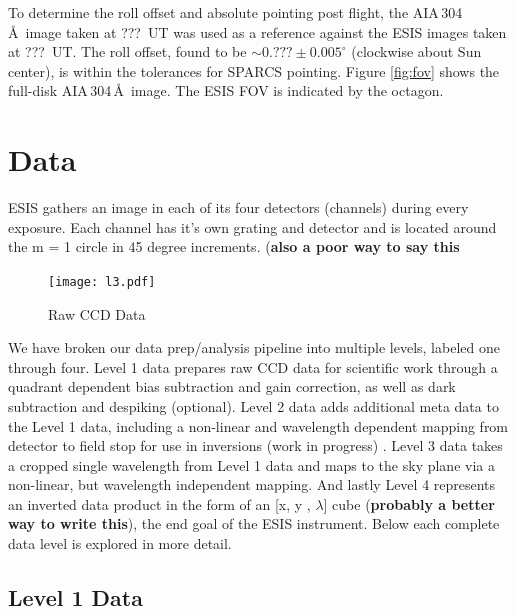 		To determine the roll offset and absolute pointing post flight, the AIA\,304\,\AA\ image taken at ???~UT was used as a reference against the ESIS images taken at ???~UT.  The roll offset, found to be $\sim0.???\pm 0.005^\circ$ (clockwise about Sun center), is within the tolerances for SPARCS pointing.  Figure \ref{fig:fov} shows the full-disk AIA\,304\,\AA\ image. The ESIS FOV is indicated by the octagon.  
	
\section{Data} 

    ESIS gathers an image in each of its four detectors (channels) during every exposure.  
    Each channel has it's own grating and detector and is located around the m = 1 circle in 45 degree increments. (\textbf{also a poor way to say this}
    
    \begin{figure}[ht]
        \centering
       	\texttt{[image: l3.pdf]}
        \caption{Raw CCD Data}
        \label{fig:Level0}
    \end{figure}
    
    We have broken our data prep/analysis pipeline into multiple levels, labeled one through four.
    Level 1 data prepares raw CCD data for scientific work through a quadrant dependent bias subtraction and gain correction, as well as dark subtraction and despiking (optional).
    Level 2 data adds additional meta data to the Level 1 data, including a non-linear and wavelength dependent mapping from detector to field stop for use in inversions (work in progress)  .
    Level 3 data takes a cropped single wavelength from Level 1 data and maps to the sky plane via a non-linear, but wavelength independent mapping.
    And lastly Level 4 represents an inverted data product in the form of an [x, y , $\lambda$] cube (\textbf{probably a better way to write this}), the end goal of the ESIS instrument.
    Below each complete data level is explored in more detail.
    
    \subsection{Level 1 Data}
    

